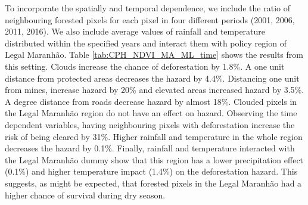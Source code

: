 To incorporate the spatially and temporal dependence, we include the ratio of neighbouring forested pixels for each pixel in four different periods (2001, 2006, 2011, 2016). We also include average values of rainfall and temperature distributed within the specified years and interact them with policy region of Legal Maranhão. Table \ref{tab:CPH_NDVI_MA_ML_time} shows the results from this setting. Clouds increase the chance of deforestation by 1.8\%. A one unit distance from protected areas decreases the hazard by 4.4\%. Distancing one unit from mines, increase hazard by 20\% and elevated areas increased hazard by 3.5\%. A degree distance from roads decrease hazard by almost 18\%. Clouded pixels in the Legal Maranhão region do not have an effect on hazard. Observing the time dependent variables, having neighbouring pixels with deforestation increase the risk of being cleared by 31\%. Higher rainfall and temperature in the whole region decreases the hazard by 0.1\%. Finally, rainfall and temperature interacted with the Legal Maranhão dummy show that this region has a lower precipitation effect (0.1\%) and higher temperature impact (1.4\%) on the deforestation hazard. This suggests, as might be expected, that forested pixels in the Legal Maranhão had a higher chance of survival during dry season.  

